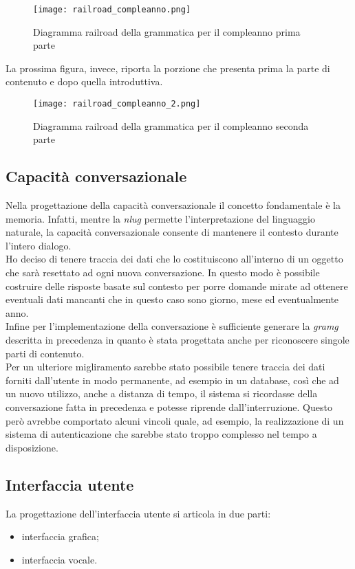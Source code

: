 	\begin{figure}[htbp]
		\begin{center}
			\texttt{[image: railroad\_compleanno.png]}
			\caption{Diagramma railroad della grammatica per il compleanno prima parte}
		\end{center}
	\end{figure}
	\pagebreak

	La prossima figura, invece, riporta la porzione che presenta prima la parte di contenuto e dopo quella introduttiva.
	\begin{figure}[htbp]
		\begin{center}
			\texttt{[image: railroad\_compleanno\_2.png]}
			\caption{Diagramma railroad della grammatica per il compleanno seconda parte}
		\end{center}
	\end{figure}
	\pagebreak

	\subsection{Capacità conversazionale}
	Nella progettazione della capacità conversazionale il concetto fondamentale è la memoria. Infatti, mentre la \emph{\gls{nlug}} permette l'interpretazione del linguaggio naturale, la capacità conversazionale consente di mantenere il contesto durante l'intero dialogo. \\
	Ho deciso di tenere traccia dei dati che lo costituiscono all'interno di un oggetto che sarà resettato ad ogni nuova conversazione. In questo modo è possibile costruire delle risposte basate sul contesto per porre domande mirate ad ottenere eventuali dati mancanti che in questo caso sono giorno, mese ed eventualmente anno. \\
	Infine per l'implementazione della conversazione è sufficiente generare la \emph{\gls{gramg}} descritta in precedenza in quanto è stata progettata anche per riconoscere singole parti di contenuto. \\
	Per un ulteriore migliramento sarebbe stato possibile tenere traccia dei dati forniti dall'utente in modo permanente, ad esempio in un database, così che ad un nuovo utilizzo, anche a distanza di tempo, il sistema si ricordasse della conversazione fatta in precedenza e potesse riprende dall'interruzione. Questo però avrebbe comportato alcuni vincoli quale, ad esempio, la realizzazione di un sistema di autenticazione che sarebbe stato troppo complesso nel tempo a disposizione. 
	\subsection{Interfaccia utente}
	La progettazione dell'interfaccia utente si articola in due parti:
	\begin{itemize}
		\item interfaccia grafica;
		\item interfaccia vocale.
	\end{itemize}
